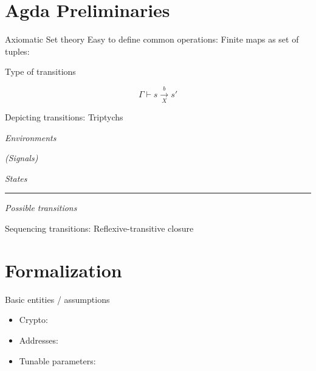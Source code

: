 \documentclass[aspectratio=169]{beamer}
\renewcommand\alert[1]{\textcolor{mLightBrown}{#1}}
\begin{document}
\section{Agda Preliminaries}

\begin{frame}{Axiomatic Set theory}
Easy to define \alert{common operations}:
\setTheory
\pause
\vfill
Finite \alert{maps} as set of tuples:
\setTheoryMaps
\end{frame}

\begin{frame}{Type of transitions}
\begin{center}
\[ Γ ⊢ s \xrightarrow[X]{b} s' \]
\end{center}
\pause
\vfill
\transitionType
\end{frame}

\begin{frame}{Depicting transitions: Triptychs}
\begin{minipage}{.4\textwidth}
\emph{Environments}

\emph{(Signals)}
\end{minipage}
\hfill\vrule\hfill
\begin{minipage}{.4\textwidth}
\emph{States}
\end{minipage}
\hrule
\centering
\vspace{2pt}
\emph{Possible transitions}
\end{frame}


\begin{frame}{Sequencing transitions: Reflexive-transitive closure}
\rtClosure
\end{frame}

\section{Formalization}

\begin{frame}{Basic entities / assumptions}
\begin{itemize}
\item Crypto:
\crypto
\pause
\vspace{-.2cm}
\item Addresses:
\addresses
\pause
\vspace{-.2cm}
\item Tunable parameters:
\parameters
\end{itemize}
\end{frame}

\end{document}
